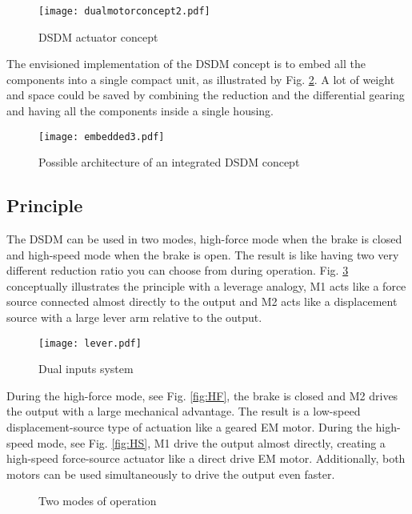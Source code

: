 \begin{figure}[H]
	\centering
		\texttt{[image: dualmotorconcept2.pdf]}
	\caption{DSDM actuator concept}
	\label{fig:dualmotorconcept}
\end{figure}

The envisioned implementation of the DSDM concept is to embed all the components into a single compact unit, as illustrated by Fig. \ref{fig:embedded}. A lot of weight and space could be saved by combining the reduction and the differential gearing and having all the components inside a single housing. 


\begin{figure}[H]
	\centering
		\texttt{[image: embedded3.pdf]}
	\caption{Possible architecture of an integrated DSDM concept}
	\label{fig:embedded}
\end{figure}



\subsection{Principle}

The DSDM can be used in two modes, high-force mode when the brake is closed and high-speed mode when the brake is open. The result is like having two very different reduction ratio you can choose from during operation. Fig. \ref{fig:lever} conceptually illustrates the principle with a leverage analogy, M1 acts like a force source connected almost directly to the output and M2 acts like a displacement source with a large lever arm relative to the output. 
%
\begin{figure}[H]
	\centering
		\texttt{[image: lever.pdf]}
	\caption{Dual inputs system}
	\label{fig:lever}
\end{figure}
%
During the high-force mode, see Fig. \ref{fig:HF}, the brake is closed and M2 drives the output with a large mechanical advantage. The result is a low-speed displacement-source type of actuation like a geared EM motor. During the high-speed mode, see Fig. \ref{fig:HS}, M1 drive the output almost directly, creating a high-speed force-source actuator like a direct drive EM motor. Additionally, both motors can be used simultaneously to drive the output even faster.
%
\begin{figure}[H]
        \centering
        \caption{Two modes of operation}\label{fig:opmode}
\end{figure}

